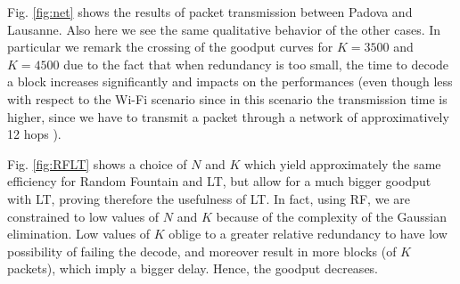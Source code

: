 Fig. \ref{fig:net} shows the results of packet transmission between Padova and Lausanne. Also here we see the same qualitative behavior of the other cases. In particular we remark the crossing of the goodput curves for $K=3500$ and $K=4500$ due to the fact that when redundancy is too small, the time to decode a block increases significantly and impacts on the performances (even though less with respect to the Wi-Fi scenario since in this scenario the transmission time is higher, since we have to transmit a packet through a network of approximatively 12 hops ).


Fig. \ref{fig:RFLT} shows a choice of $N$ and $K$ which yield approximately the same efficiency for Random Fountain and LT, but allow for a much bigger goodput with LT, proving therefore the usefulness of LT. In fact, using RF, we are constrained to low values of $N$ and $K$  because of the complexity of the Gaussian elimination. Low values of $K$ oblige to a greater relative redundancy to have low possibility of failing the decode, and moreover result in more blocks (of $K$ packets), which imply a bigger delay. Hence, the goodput decreases.
